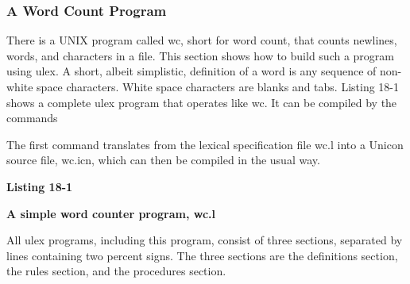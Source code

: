 \subsubsection{A Word Count Program}

There is a UNIX program called \textsf{wc}, short for word count, that counts newlines, words, and characters in a
file. This section shows how to build such a program using
\textsf{ulex}. A short, albeit simplistic, definition of a word is any
sequence of non-white space characters. White space characters are
blanks and tabs. Listing 18-1 shows a complete \textsf{ulex} program that
operates like \textsf{wc}.  It can be compiled by the commands


The first command translates from the lexical specification file wc.l
into a Unicon source file, wc.icn, which can then be compiled in the
usual way.

\pagebreak


\bigskip

{\sffamily\bfseries
Listing 18-1}

{\sffamily\bfseries
A simple word counter program, wc.l}


All \textsf{ulex} programs, including this program, consist of three
sections, separated by lines containing two percent signs. The three
sections are the definitions section, the rules section, and the
procedures section.

